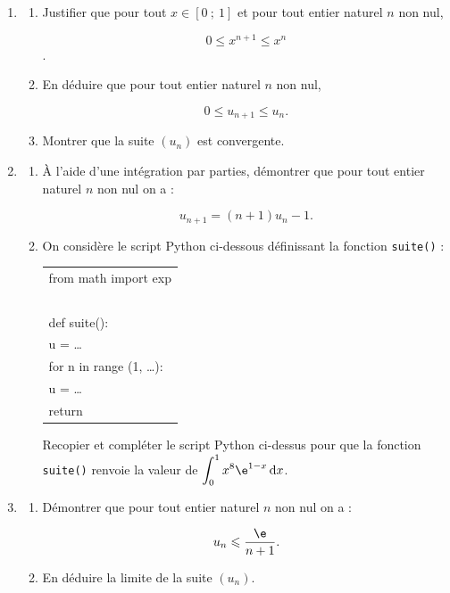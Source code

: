 \begin{enumerate}
\item 
	\begin{enumerate}
		\item Justifier que pour tout $x \in [0~;~1]$ et pour tout entier naturel $n$ non nul,
		
		\[0 \leqslant x^{n+1} \leqslant x^n\].
		\item En déduire que pour tout entier naturel $n$ non nul,
		
		\[0 \leqslant u_{n+1} \leqslant u_n.\]
			
		\item Montrer que la suite $(u_n)$ est convergente.
	\end{enumerate}
\item 
	\begin{enumerate}
		\item À l’aide d’une intégration par parties, démontrer que pour tout entier naturel $n$ non nul on a :

\[u_{n+1} = (n + 1)u_n - 1.\]

\item On considère le script Python ci-dessous définissant la fonction \texttt{suite()} :

\begin{center}
\begin{ttfamily}
\begin{tabular}{|l|}\hline
from math import exp\\
~\\
def suite():\\
\quad u = \ldots\\
\quad for n in range (1, \ldots):\\
\quad \quad \quad u = \ldots\\
\quad return\\ \hline
\end{tabular}
\end{ttfamily}
\end{center}

Recopier et compléter le script Python ci-dessus pour que la fonction \texttt{suite()} renvoie la valeur de $\displaystyle\int_0^1 x^8 \e^{1-x} \, \text{d}x$.
	\end{enumerate}

\item 
	\begin{enumerate}
		\item Démontrer que pour tout entier naturel $n$ non nul on a :

\[u_{n} \leqslant \frac{\e}{n+1}.\]

		\item En déduire la limite de la suite $(u_n)$.
	\end{enumerate}
\end{enumerate}
